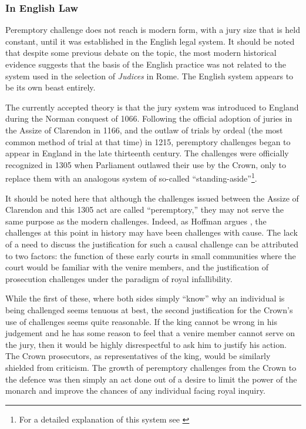 \documentclass{article}
\begin{document}
\subsubsection{In English Law}

Peremptory challenge does not reach is modern form, with a jury size that is held constant, until it was established in the
English legal system. It should be noted that despite some previous debate on the topic, the most modern historical evidence
suggests that the basis of the English practice was not related to the system used in the selection of \textit{Judices} in
Rome. The English system appears to be its own beast entirely.

The currently accepted theory is that the jury system was introduced to England during the Norman conquest of 1066. Following
the official adoption of juries in the Assize of Clarendon in 1166, and the outlaw of trials by ordeal (the most common method of
trial at that time) in 1215, peremptory challenges began to appear in England in the late thirteenth century. The challenges were
officially recognized in 1305 when Parliament outlawed their use by the Crown, only to replace them with an analogous system of
so-called ``standing-aside''\footnote{For a detailed explanation of this system see \cite{hoffman1997}}.

It should be noted here that although the challenges issued between the Assize of Clarendon and this 1305 act are called
``peremptory,'' they may not serve the same purpose as the modern challenges. Indeed, as Hoffman argues \cite{hoffman1997}, the
challenges at this point in history may have been challenges with cause. The lack of a need to discuss the justification for such
a causal challenge can be attributed to two factors: the function of these early courts in small communities where the court would
be familiar with the venire members, and the justification of prosecution challenges under the paradigm of royal infallibility.

While the first of these, where both sides simply ``know'' why an individual is being challenged seems tenuous at best, the second
justification for the Crown's use of challenges seems quite reasonable. If the king cannot be wrong in his judgement and he has
some reason to feel that a venire member cannot serve on the jury, then it would be highly disrespectful to ask him to justify his
action. The Crown prosecutors, as representatives of the king, would be similarly shielded from criticism. The growth of
peremptory challenges from the Crown to the defence was then simply an act done out of a desire to limit the power of the monarch
and improve the chances of any individual facing royal inquiry. 
\end{document}
